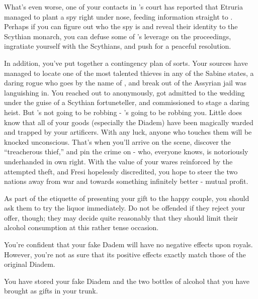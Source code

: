 \documentclass[char]{Kos}
\begin{document}
What's even worse, one of your contacts in \cScythiaKing{\Monarch} \cScythiaKing{}'s court has reported that Etruria managed to plant a spy right under \cScythiaKing{\their} nose, feeding information straight to \cEtruriaKing{}. Perhaps if you can figure out who the spy is and reveal their identity to the Scythian monarch, you can defuse some of \cEtruriaKing{}'s leverage on the proceedings, ingratiate yourself with the Scythians, and push for a peaceful resolution.

In addition, you've put together a contingency plan of sorts. Your sources have managed to locate one of the most talented thieves in any of the Sabine states, a daring rogue who goes by the name of \cBurglar{}, and break \cBurglar{\them} out of the Assyrian jail \cBurglar{\they} was languishing in. You reached out to \cBurglar{\them} anonymously, got \cBurglar{\them} admitted to the wedding under the guise of a Scythian fortuneteller, and commissioned \cBurglar{\them} to stage a daring heist. But \cBurglar{\they}'s not going to be robbing \cArmsDealer{} - \cBurglar{\they}'s going to be robbing you. Little does \cBurglar{\they} know that all of your goods (especially the Diadem) have been magically warded and trapped by your artificers. With any luck, anyone who touches them will be knocked unconscious. That's when you'll arrive on the scene, discover the ``treacherous thief,'' and pin the crime on \cArmsDealer{} - who, everyone knows, is notoriously underhanded in \cArmsDealer{\their} own right. With the value of your wares reinforced by the attempted theft, and Fresi hopelessly discredited, you hope to steer the two nations away from war and towards something infinitely better - mutual profit.

\begin{itemz}[Notes]
  \item As part of the etiquette of presenting your gift to the happy couple, you should ask them to try the liquor immediately. Do not be offended if they reject your offer, though; they may decide quite reasonably that they should limit their alcohol consumption at this rather tense occasion.
  \item You're confident that your fake Dadem will have no negative effects upon royals. However, you're not as sure that its positive effects exactly match those of the original Diadem.
  \item You have stored your fake Diadem and the two bottles of alcohol that you have brought as gifts in your trunk.
  \end{itemz}
\end{document}
